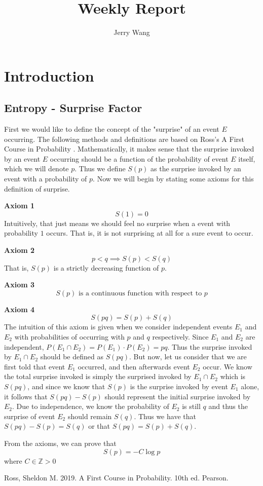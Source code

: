 \documentclass{article}
\title{Weekly Report}
\author{Jerry Wang}
\date{ }
\begin{document}
\maketitle

\tableofcontents
\newpage
\section{Introduction}
\subsection{Entropy - Surprise Factor}
First we would like to define the concept of the "surprise" of an event $E$ occurring. The following methods and definitions are based on Ross's A First Course in Probability \cite{b1}. Mathematically, it makes sense that the surprise invoked by an event $E$ occurring should be a function of the probability of event $E$ itself, which we will denote $p$.
Thus we define $S(p)$ as the surprise invoked by an event with a probability of $p$. 
Now we will begin by stating some axioms for this definition of surprise.

\textbf{Axiom 1}
\[S(1) = 0\]
Intuitively, that just means we should feel no surprise when a event with probability $1$ occurs. That is, it is not surprising at all for a sure event to occur.

\textbf{Axiom 2}
\[
p<q \implies S(p)<S(q)
\]
That is, $S(p)$ is a strictly decreasing function of $p$.

\textbf{Axiom 3}
\[
S(p) \text{ is a continuous function with respect to $p$}
\]

\textbf{Axiom 4}
\[
S(pq) =S(p)+S(q)
\]
The intuition of this axiom is given when we consider independent events $E_1$ and $E_2$ with probabilities of occurring with $p$ and $q$ respectively. 
Since $E_1$ and $E_2$ are independent, $P(E_1 \cap E_2) = P(E_1)\cdot P(E_2) = pq$. 
Thus the surprise invoked by $E_1 \cap E_2$ should be defined as $S(pq)$. 
But now, let us consider that we are first told that event $E_1$ occurred, and then afterwards event $E_2$ occur. 
We know the total surprise invoked is simply the surprised invoked by $E_1 \cap E_2$ which is $S(pq)$, and since we know that $S(p)$ is the surprise invoked by event $E_1$ alone, it follows that $S(pq) - S(p)$ should represent the initial surprise invoked by $E_2$. 
Due to independence, we know the probability of $E_2$ is still $q$ and thus the surprise of event $E_2$ should remain $S(q)$. 
Thus we have that $S(pq) - S(p) = S(q)$ or that $S(pq) =S(p)+S(q)$. 

\bigskip

From the axioms, we can prove that
\[
S(p) = -C\log p
\]
where $C\in \mathbb{Z} > 0$

\newpage
\begin{thebibliography}{00}
 Ross, Sheldon M. 2019. A First Course in Probability. 10th ed. Pearson.
\end{thebibliography}
\end{document}
